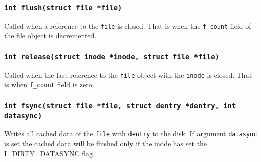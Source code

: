 \subsubsection{\texttt{int flush(struct file *file)}}

Called when a reference to the \texttt{file} is closed. That is when the
\texttt{f\_count} field of the file object is decremented.

\subsubsection{\texttt{int release(struct inode *inode, struct file *file)}}

Called when the last reference to the \texttt{file} object with the \texttt{inode} is
closed. That is when \texttt{f\_count} field is zero.

\subsubsection{\texttt{int fsync(struct file *file, struct dentry *dentry, int datasync)}}

Writes all cached data of the \texttt{file} with \texttt{dentry} to the disk. If
argument \texttt{datasync} is set the cached data will be flushed only if the inode
has set the I\_DIRTY\_DATASYNC flag.

